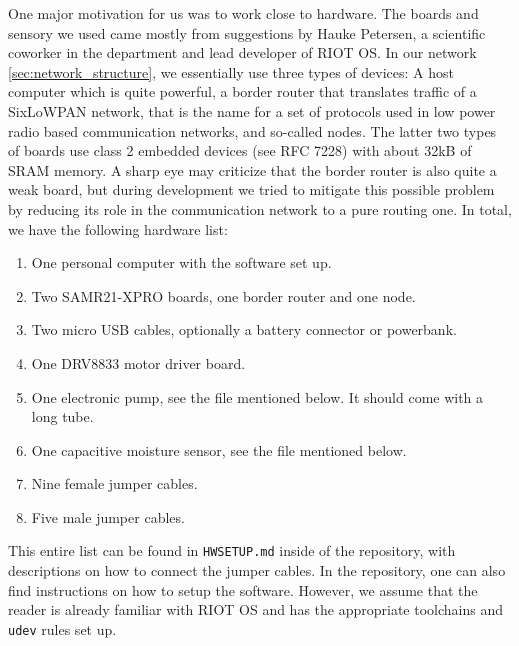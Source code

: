 \documentclass[acmtog, language=english, nonacm]{acmart}
\begin{document}
    One major motivation for us was to work close to hardware. The boards and sensory we used came mostly from suggestions by Hauke Petersen, a scientific coworker in the department and lead developer of RIOT OS. In our network \cref{sec:network_structure}, we essentially use three types of devices: A host computer which is quite powerful, a border router that translates traffic of a SixLoWPAN network, that is the name for a set of protocols used in low power radio based communication networks, and so-called nodes. The latter two types of boards use class 2 embedded devices (see RFC 7228) with about 32kB of SRAM memory. A sharp eye may criticize that the border router is also quite a weak board, but during development we tried to mitigate this possible problem by reducing its role in the communication network to a pure routing one. In total, we have the following hardware list:
    \begin{enumerate}
        \item One personal computer with the software set up.
        \item Two SAMR21-XPRO boards, one border router and one node.
        \item Two micro USB cables, optionally a battery connector or powerbank.
        \item One DRV8833 motor driver board.
        \item One electronic pump, see the file mentioned below. It should come with a long tube.
        \item One capacitive moisture sensor, see the file mentioned below.
        \item Nine female jumper cables.
        \item Five male jumper cables.
    \end{enumerate}
    This entire list can be found in \texttt{HWSETUP.md} inside of the repository, with descriptions on how to connect the jumper cables. In the repository, one can also find instructions on how to setup the software. However, we assume that the reader is already familiar with RIOT OS and has the appropriate toolchains and \texttt{udev} rules set up.
\end{document}
